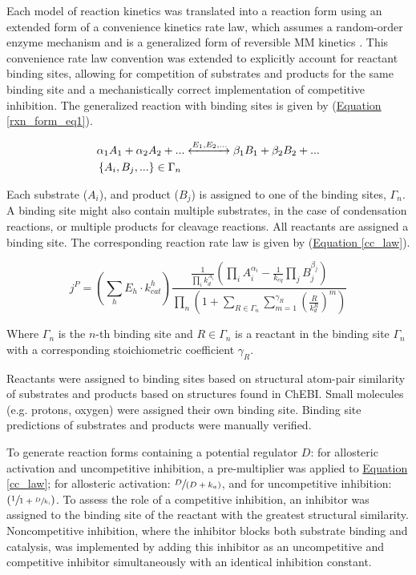 Each model of reaction kinetics was translated into a reaction form using an extended form of a convenience kinetics rate law, which assumes a random-order enzyme mechanism and is a generalized form of reversible MM kinetics \cite{Liebermeister:2006fm}. This convenience rate law convention was extended to explicitly account for reactant binding sites, allowing for competition of substrates and products for the same binding site and a mechanistically correct implementation of competitive inhibition. The generalized reaction with binding sites is given by (\hyperref[rxn_form_eq1]{Equation \ref{rxn_form_eq1}}).

\begin{align}
&\alpha_{1}A_{1} + \alpha_{2}A_{2} + ... \xleftrightarrow{E_{1}, E_{2}, ...} \beta_{1}B_{1} + \beta_{2}B_{2} + ...\notag\\
&\left\{A_{i}, B_{j}, ...\right\} \in \Gamma_{n}\label{rxn_form_eq1}
\end{align}

Each substrate ($A_{i}$), and product ($B_{j}$) is assigned to one of the binding sites, $\Gamma_{n}$. A binding site might also contain multiple substrates, in the case of condensation reactions, or multiple products for cleavage reactions. All reactants are assigned a binding site. The corresponding reaction rate law is given by (\hyperref[cc_law]{Equation \ref{cc_law}}).

\begin{equation}
j^{P} = \left(\sum_{h}E_{h} \cdot k^{h}_{cat}\right)\frac{\frac{1}{\prod_{i}k_{d}^{A_{i}}}\left(\prod_{i}A_{i}^{\alpha_{i}} - \frac{1}{k_{eq}} \prod_{j}B_{j}^{\beta_{j}}\right)}{\prod_{n}\left(1 + \sum_{R \in \Gamma_{n}} \sum_{m = 1}^{\gamma_{R}}\left(\frac{R}{k_{d}^{R}}\right)^{m} \right)}\label{cc_law}
\end{equation}

Where $\Gamma_{n}$ is the $n$-th binding site and $R \in \Gamma_{n}$ is a reactant in the binding site $\Gamma_{n}$ with a corresponding stoichiometric coefficient $\gamma_{R}$.

Reactants were assigned to binding sites based on structural atom-pair similarity of substrates and products \cite{Cao:2008fa} based on structures found in ChEBI.  Small molecules (e.g. protons, oxygen) were assigned their own binding site.  Binding site predictions of substrates and products were manually verified.

To generate reaction forms containing a potential regulator $D$: for allosteric activation and uncompetitive inhibition, a pre-multiplier was applied to \hyperref[cc_law]{Equation \ref{cc_law}}; for allosteric activation: $\sfrac{D}{(D + k_{a})}$, and for uncompetitive inhibition: $(\sfrac{1}{1 + \sfrac{D}{k_{i}}})$.  To assess the role of a competitive inhibition, an inhibitor was assigned to the binding site of the reactant with the greatest structural similarity.  Noncompetitive inhibition, where the inhibitor blocks both substrate binding and catalysis, was implemented by adding this inhibitor as an uncompetitive and competitive inhibitor simultaneously with an identical inhibition constant.  

